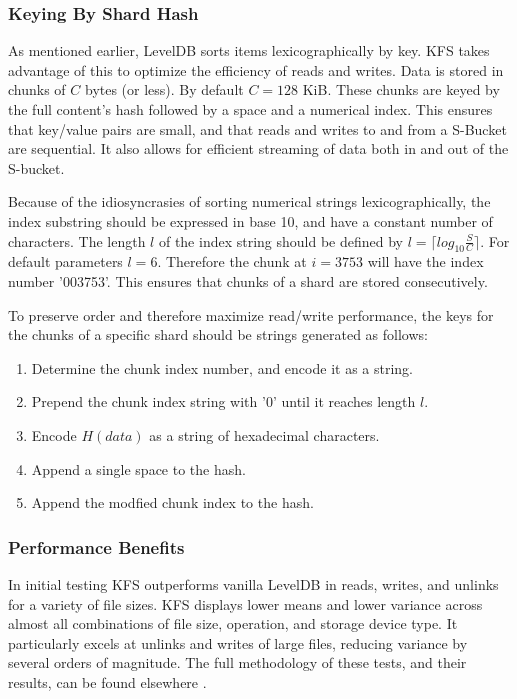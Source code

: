 \documentclass[a4paper,10pt]{article}
\begin{document}
\subsubsection{Keying By Shard Hash}
As mentioned earlier, LevelDB sorts items lexicographically by key. KFS takes advantage of this to optimize the efficiency of reads and writes. Data is stored in chunks of $ C $ bytes (or less). By default $ C = 128 $ KiB. These chunks are keyed by the full content's hash followed by a space and a numerical index. This ensures that key/value pairs are small, and that reads and writes to and from a S-Bucket are sequential. It also allows for efficient streaming of data both in and out of the S-bucket.

Because of the idiosyncrasies of sorting numerical strings lexicographically, the index substring should be expressed in base 10, and have a constant number of characters. The length $ l $ of the index string should be defined by $ l = \lceil log_{10} \frac{S}{C} \rceil $. For default parameters $ l = 6 $. Therefore the chunk at $ i = 3753 $ will have the index number '003753'. This ensures that chunks of a shard are stored consecutively.

To preserve order and therefore maximize read/write performance, the keys for the chunks of a specific shard should be strings generated as follows:

\begin{enumerate}
\item Determine the chunk index number, and encode it as a string.
\item Prepend the chunk index string with '0' until it reaches length $ l $.
\item Encode $ H(data) $ as a string of hexadecimal characters.
\item Append a single space to the hash.
\item Append the modfied chunk index to the hash.
\end{enumerate}

\subsubsection{Performance Benefits}
In initial testing KFS outperforms vanilla LevelDB in reads, writes, and unlinks for a variety of file sizes. KFS displays lower means and lower variance across almost all combinations of file size, operation, and storage device type. It particularly excels at unlinks and writes of large files, reducing variance by several orders of magnitude. The full methodology of these tests, and their results, can be found elsewhere \cite{13}.
\end{document}
